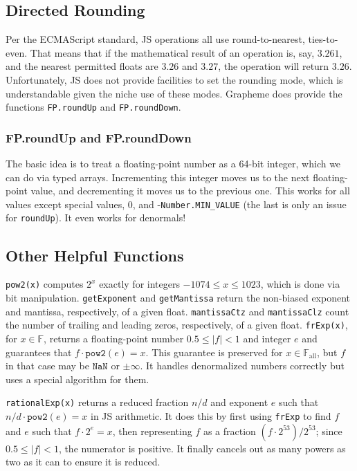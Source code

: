\documentclass{article}
\newcommand{\NaN}{\texttt{NaN}}
\newcommand{\allfp}{\mathbb{F}_\text{all}}
\newcommand{\finitefp}{\mathbb{F}}
\begin{document}
\subsection{Directed Rounding}

Per the ECMAScript standard, JS operations all use round-to-nearest, ties-to-even. That means that if the mathematical result of an operation is, say, $3.261$, and the nearest permitted floats are $3.26$ and $3.27$, the operation will return $3.26$. Unfortunately, JS does not provide facilities to set the rounding mode, which is understandable given the niche use of these modes. Grapheme does provide the functions \texttt{FP.roundUp} and \texttt{FP.roundDown}.

\subsubsection{FP.roundUp and FP.roundDown}

The basic idea is to treat a floating-point number as a 64-bit integer, which we can do via typed arrays. Incrementing this integer moves us to the next floating-point value, and decrementing it moves us to the previous one. This works for all values except special values, 0, and -\texttt{Number.MIN\_VALUE} (the last is only an issue for \texttt{roundUp}). It even works for denormals!

\subsection{Other Helpful Functions}

\texttt{pow2(x)} computes $2^x$ exactly for integers $-1074\leq x \leq 1023$, which is done via bit manipulation. \texttt{getExponent} and \texttt{getMantissa} return the non-biased exponent and mantissa, respectively, of a given float. \texttt{mantissaCtz} and \texttt{mantissaClz} count the number of trailing and leading zeros, respectively, of a given float. \texttt{frExp(x)}, for $x\in \finitefp$, returns a floating-point number $0.5\leq |f| < 1$ and integer $e$ and guarantees that $f\cdot \texttt{pow2}(e)=x$. This guarantee is preserved for $x\in \allfp$, but $f$ in that case may be $\NaN$ or $\pm \infty$. It handles denormalized numbers correctly but uses a special algorithm for them.

\texttt{rationalExp(x)} returns a reduced fraction $n/d$ and exponent $e$ such that $n/d\cdot \texttt{pow2}(e)=x$ in JS arithmetic. It does this by first using \texttt{frExp} to find $f$ and $e$ such that $f\cdot 2^e = x$, then representing $f$ as a fraction $(f\cdot 2^{53})/2^{53}$; since $0.5\leq |f| < 1$, the numerator is positive. It finally cancels out as many powers as two as it can to ensure it is reduced.
\end{document}
